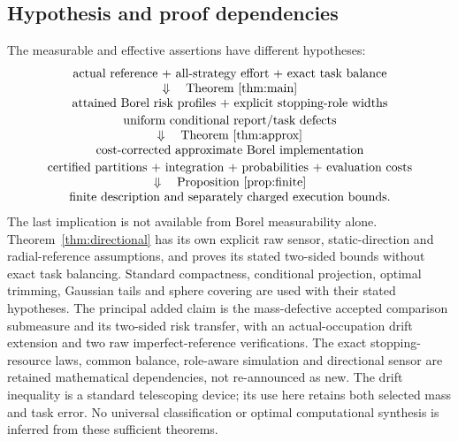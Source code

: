 \subsection*{Hypothesis and proof dependencies}
The measurable and effective assertions have different hypotheses:
\[
\begin{array}{c}
 \text{actual reference + all-strategy effort + exact task balance}\\
 \Downarrow\quad\text{Theorem~\ref{thm:main}}\\
 \text{attained Borel risk profiles + explicit stopping-role widths}\\[2pt]
 \text{uniform conditional report/task defects}\\
 \Downarrow\quad\text{Theorem~\ref{thm:approx}}\\
 \text{cost-corrected approximate Borel implementation}\\[2pt]
 \text{certified partitions + integration + probabilities + evaluation costs}\\
 \Downarrow\quad\text{Proposition~\ref{prop:finite}}\\
 \text{finite description and separately charged execution bounds}.
\end{array}
\]
The last implication is not available from Borel measurability alone. Theorem~\ref{thm:directional} has its own explicit raw sensor, static-direction and radial-reference assumptions, and proves its stated two-sided bounds without exact task balancing. Standard compactness, conditional projection, optimal trimming, Gaussian tails and sphere covering are used with their stated hypotheses. The principal added claim is the mass-defective accepted comparison submeasure and its two-sided risk transfer, with an actual-occupation drift extension and two raw imperfect-reference verifications. The exact stopping-resource laws, common balance, role-aware simulation and directional sensor are retained mathematical dependencies, not re-announced as new. The drift inequality is a standard telescoping device; its use here retains both selected mass and task error. No universal classification or optimal computational synthesis is inferred from these sufficient theorems.


